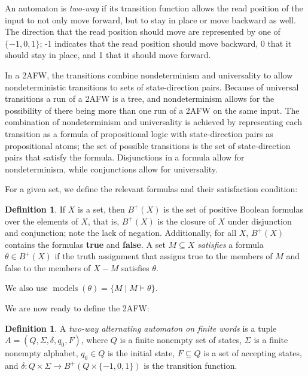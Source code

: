 \documentclass[10pt,a4paper]{amsart}
\theoremstyle{plain}
\theoremstyle{definition}
\newtheorem{definition}[thm]{Definition}
\theoremstyle{definition}
\DeclareMathOperator{\?}{?}
\DeclareMathOperator{\mymodels}{models}
\begin{document}
An automaton is \textit{two-way} if its transition function allows the read position of the
input to not only move forward, but to stay in place or move backward as well. The direction
that the read position should move are represented by one of $\{-1,0,1\}$; -1 indicates
that the read position should move backward, 0 that it should stay in place, and 1 that it
should move forward.

In a 2AFW, the transitions combine nondeterminism and universality to allow nondeterministic
transitions to sets of state-direction pairs. Because of universal transitions a run of a 2AFW
is a tree, and nondeterminism allows for the possibility of there being more than one run of
a 2AFW on the same input. The combination of nondeterminism and universality is achieved by
representing each transition as a formula of propositional logic with state-direction pairs
as propositional atoms; the set of possible transitions is the set of state-direction pairs that
satisfy the formula. Disjunctions in a formula allow for nondeterminism, while conjunctions
allow for universality.



For a given set, we define the relevant formulas and their satisfaction condition:

    \begin{definition}\label{def:positive_boolean}
If $X$ is a set, then $B^+(X)$ is the set of positive Boolean formulas over the elements of
    $X$, that is, $B^+(X)$ is the closure of $X$ under disjunction and conjunction; note
    the lack of negation. Additionally, for all $X$, $B^+(X)$ contains the formulas
    \textbf{true} and \textbf{false}.  A set
$M \subseteq X$ \textit{satisfies} a formula $\theta \in B^+(X)$ if the truth
assignment that assigns true to the members of $M$ and false to the members of
$X - M$ satisfies $\theta$.
\end{definition}
We also use $\mymodels(\theta) = \{M \mid M \models \theta \}$.

We are now ready to define the 2AFW:

    \begin{definition}\label{def:2afw_simple}
A \textit{two-way alternating automaton on finite words} is a tuple $A = (Q, \Sigma, \delta, \allowbreak q_0,
F)$, where $Q$ is a finite nonempty set of states, $\Sigma$ is a finite nonempty alphabet, $q_0
\in Q$ is the initial state, $F \subseteq Q$ is a set of accepting states, and $\delta :
Q \times \Sigma \rightarrow B^+(Q \times \{-1, 0, 1\})$ is the transition function.
    \end{definition}
\end{document}
